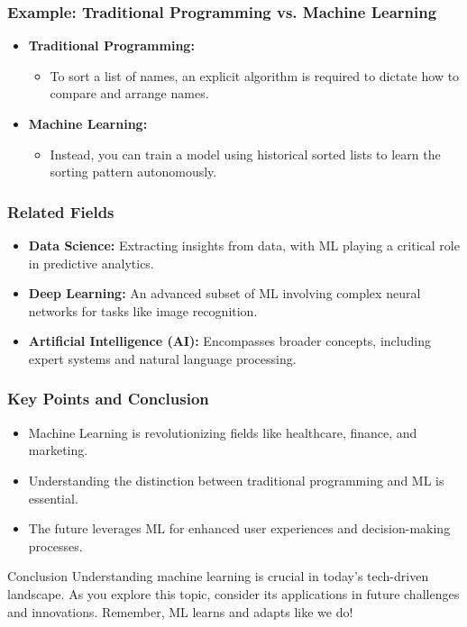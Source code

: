 \documentclass[aspectratio=169]{beamer}
\begin{document}
\begin{frame}[fragile]
    \frametitle{Example: Traditional Programming vs. Machine Learning}
    \begin{itemize}
        \item \textbf{Traditional Programming:} 
        \begin{itemize}
            \item To sort a list of names, an explicit algorithm is required to dictate how to compare and arrange names.
        \end{itemize}
        \item \textbf{Machine Learning:} 
        \begin{itemize}
            \item Instead, you can train a model using historical sorted lists to learn the sorting pattern autonomously.
        \end{itemize}
    \end{itemize}
\end{frame}

\begin{frame}[fragile]
    \frametitle{Related Fields}
    \begin{itemize}
        \item \textbf{Data Science:} Extracting insights from data, with ML playing a critical role in predictive analytics.
        \item \textbf{Deep Learning:} An advanced subset of ML involving complex neural networks for tasks like image recognition.
        \item \textbf{Artificial Intelligence (AI):} Encompasses broader concepts, including expert systems and natural language processing.
    \end{itemize}
\end{frame}

\begin{frame}[fragile]
    \frametitle{Key Points and Conclusion}
    \begin{itemize}
        \item Machine Learning is revolutionizing fields like healthcare, finance, and marketing.
        \item Understanding the distinction between traditional programming and ML is essential.
        \item The future leverages ML for enhanced user experiences and decision-making processes.
    \end{itemize}
    \begin{block}{Conclusion}
        Understanding machine learning is crucial in today’s tech-driven landscape. As you explore this 
        topic, consider its applications in future challenges and innovations. Remember, ML learns and 
        adapts like we do!
    \end{block}
\end{frame}
\end{document}
